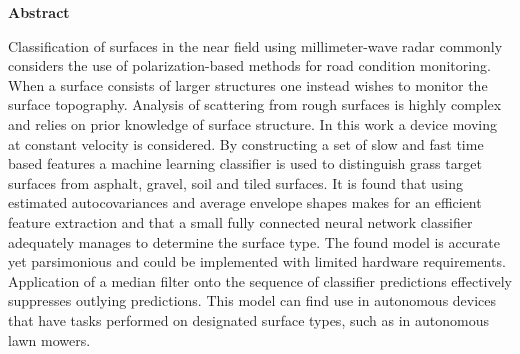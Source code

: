 \newenvironment{abstract}%
    {\cleardoublepage\thispagestyle{empty}\null\vfill\begin{center}%
    \bfseries{\textsf{Abstract}}\end{center}}%
    {\vfill\null}
\begin{abstract}
Classification of surfaces in the near field using millimeter-wave radar commonly considers the use of polarization-based methods for road condition monitoring. When a surface consists of larger structures one instead wishes to monitor the surface topography. Analysis of scattering from rough surfaces is highly complex and relies on prior knowledge of surface structure. In this work a device moving at constant velocity is considered. By constructing a set of slow and fast time based features a machine learning classifier is used to distinguish grass target surfaces from asphalt, gravel, soil and tiled surfaces. It is found that using estimated autocovariances and average envelope shapes makes for an efficient feature extraction and that a small fully connected neural network classifier adequately manages to determine the surface type. The found model is accurate yet parsimonious and could be implemented with limited hardware requirements. Application of a median filter onto the sequence of classifier predictions effectively suppresses outlying predictions. This model can find use in autonomous devices that have tasks performed on designated surface types, such as in autonomous lawn mowers. 
	


\end{abstract}
